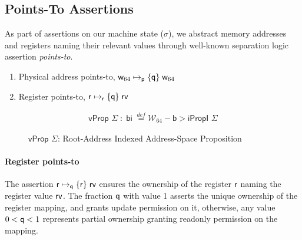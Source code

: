 \subsection{Points-To Assertions}
\label{sec:pointsto}
As part of assertions on our machine state ($\sigma$), we abstract memory addresses and registers naming their relevant values through well-known separation logic assertion \textit{points-to}.
\begin{enumerate}
\item Physical address points-to, $\mathsf{w}_{64}\mapsto_{\mathsf{p}}\{\mathsf{q}\}\;\mathsf{w}_{64}$
\item Register points-to, $\mathsf{r}\mapsto_{\mathsf{r}}\{\mathsf{q}\}\;\mathsf{rv}$
\end{enumerate}
\begin{figure}[!ht]
\[
\begin{array}{cl}
\textsf{vProp } \Sigma \; : \; \textsf{bi} \; \stackrel{def}{=} \mathcal{W}_{64} -\textsf{b}> \textsf{iPropI } \Sigma
\end{array}
\]
\caption{$\textsf{vProp }\Sigma$: Root-Address Indexed Address-Space Proposition}
  \label{fig:vprop}
\end{figure}
\paragraph{Register points-to} The assertion $\mathsf{r}\mapsto_{\mathsf{q}}\{\mathsf{r}\}\;\mathsf{rv}$ ensures the ownership of the register $\mathsf{r}$ naming the register value $\mathsf{rv}$. The fraction $\mathsf{q}$ with value 1 asserts the unique ownership of the register mapping, and grants update permission on it, otherwise, any value $0 < \mathsf{q} <1$ represents partial ownership granting readonly permission on the mapping.
